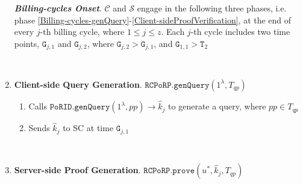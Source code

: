 \begin{enumerate}
\textbf{\textit{Billing-cycles Onset}}. $\mathcal{C}$ and $\mathcal{S}$ engage in the following three phases, i.e. phase \ref{Billing-cycles-genQuery}-\ref{Client-sideProofVerification},  at the end of every $j$-th billing cycle, where $1\leq j\leq z$. Each $j$-th cycle includes two  time points, $\texttt{G}_{\scriptscriptstyle j,1}$ and $\texttt{G}_{\scriptscriptstyle j,2}$, where $\texttt{G}_{\scriptscriptstyle j,2}>\texttt{G}_{\scriptscriptstyle j,1}$, and $\texttt{G}_{\scriptscriptstyle 1,1}>\texttt{T}_{\scriptscriptstyle 2}$ 


\

\item\textbf{Client-side Query Generation}.\label{Billing-cycles-genQuery} $\mathtt{RCPoRP}.\mathtt{genQuery}(1^\lambda,  T_{\scriptscriptstyle qp})$

\begin{enumerate}

\item Calls $\mathtt{PoRID.genQuery}(1^{\lambda},  pp)\rightarrow \hat{k}_{\scriptscriptstyle j}$ to generate a query, where  $ pp\in T_{\scriptscriptstyle qp}$
\item Sends   $\hat{k}_{\scriptscriptstyle j}$ to SC at time $\texttt{G}_{\scriptscriptstyle j,1}$


\end{enumerate}

\

\item\textbf{Server-side Proof Generation}. $\mathtt{RCPoRP}.\mathtt{prove}(u^{\scriptscriptstyle *},  \hat{k}_{\scriptscriptstyle j}, T_{\scriptscriptstyle qp})$



\end{enumerate}
